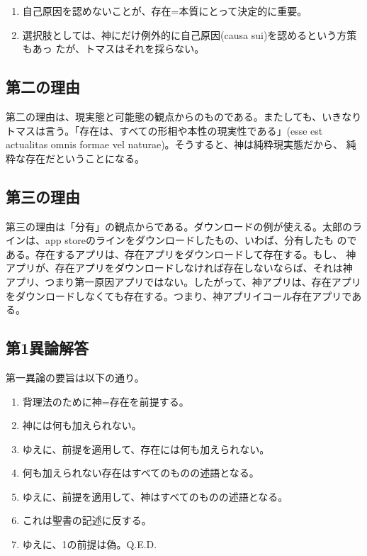 \documentclass[paper=a4paper,fontsize=10pt,jafontsize=9pt,titlepage]{jlreq}
\begin{document}
\begin{enumerate}
 \item 自己原因を認めないことが、存在=本質にとって決定的に重要。
 \item 選択肢としては、神にだけ例外的に自己原因(causa sui)を認めるという方策もあっ
       たが、トマスはそれを採らない。
\end{enumerate}


\subsection{第二の理由}
第二の理由は、現実態と可能態の観点からのものである。またしても、いきなり
トマスは言う。「存在は、すべての形相や本性の現実性である」(esse est
actualitas omnis formae vel naturae)。そうすると、神は純粋現実態だから、
純粋な存在だということになる。

\subsection{第三の理由}
第三の理由は「分有」の観点からである。ダウンロードの例が使える。太郎のラ
インは、app storeのラインをダウンロードしたもの、いわば、分有したも
のである。存在するアプリは、存在アプリをダウンロードして存在する。もし、
神アプリが、存在アプリをダウンロードしなければ存在しないならば、それは神
アプリ、つまり第一原因アプリではない。したがって、神アプリは、存在アプリ
をダウンロードしなくても存在する。つまり、神アプリイコール存在アプリであ
る。


\subsection{第1異論解答}

第一異論の要旨は以下の通り。
\begin{enumerate}
 \item 背理法のために神=存在を前提する。
 \item 神には何も加えられない。
 \item ゆえに、前提を適用して、存在には何も加えられない。
 \item 何も加えられない存在はすべてのものの述語となる。
 \item ゆえに、前提を適用して、神はすべてのものの述語となる。
 \item これは聖書の記述に反する。
 \item ゆえに、1の前提は偽。Q.E.D.
\end{enumerate}
\end{document}

